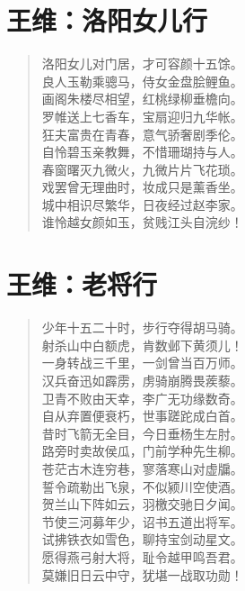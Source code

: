 \documentclass[12pt,oneside]{book}
\newenvironment{shici}{
\begin{verse}
\centering\large\hspace{12pt}}
{\end{verse}}
\begin{document}
\chapter{王维：洛阳女儿行}
\begin{shici}
洛阳女儿对门居，才可容颜十五馀。\\
良人玉勒乘骢马，侍女金盘脍鲤鱼。\\
画阁朱楼尽相望，红桃绿柳垂檐向。\\
罗帷送上七香车，宝扇迎归九华帐。\\
狂夫富贵在青春，意气骄奢剧季伦。\\
自怜碧玉亲教舞，不惜珊瑚持与人。\\
春窗曙灭九微火，九微片片飞花琐。\\
戏罢曾无理曲时，妆成只是薰香坐。\\
城中相识尽繁华，日夜经过赵李家。\\
谁怜越女颜如玉，贫贱江头自浣纱！
\end{shici}

\chapter{王维：老将行}
\begin{shici}
少年十五二十时，步行夺得胡马骑。\\
射杀山中白额虎，肯数邺下黄须儿！\\
一身转战三千里，一剑曾当百万师。\\
汉兵奋迅如霹雳，虏骑崩腾畏蒺藜。\\
卫青不败由天幸，李广无功缘数奇。\\
自从弃置便衰朽，世事蹉跎成白首。\\
昔时飞箭无全目，今日垂杨生左肘。\\
路旁时卖故侯瓜，门前学种先生柳。\\
苍茫古木连穷巷，寥落寒山对虚牖。\\
誓令疏勒出飞泉，不似颍川空使酒。\\
贺兰山下阵如云，羽檄交驰日夕闻。\\
节使三河募年少，诏书五道出将军。\\
试拂铁衣如雪色，聊持宝剑动星文。\\
愿得燕弓射大将，耻令越甲鸣吾君。\\
莫嫌旧日云中守，犹堪一战取功勋！
\end{shici}
\end{document}
